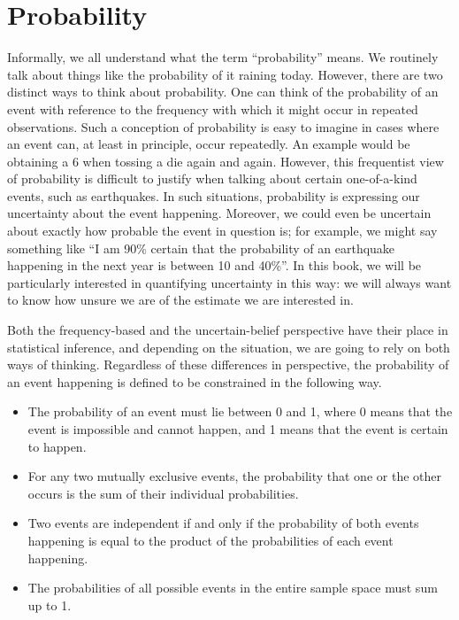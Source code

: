 \documentclass[12pt,]{krantz}
\providecommand{\tightlist}{%
  \setlength{\itemsep}{0pt}\setlength{\parskip}{0pt}}
\theoremstyle{definition}
\theoremstyle{definition}
\theoremstyle{definition}
\theoremstyle{remark}
\begin{document}
\hypertarget{introprob}{%
\section{Probability}\label{introprob}}

Informally, we all understand what the term ``probability'' means. We routinely talk about things like the probability of it raining today. However, there are two distinct ways to think about probability. One can think of the probability of an event with reference to the frequency with which it might occur in repeated observations. Such a conception of probability is easy to imagine in cases where an event can, at least in principle, occur repeatedly. An example would be obtaining a 6 when tossing a die again and again. However, this frequentist view of probability is difficult to justify when talking about certain one-of-a-kind events, such as earthquakes. In such situations, probability is expressing our uncertainty about the event happening. Moreover, we could even be uncertain about exactly how probable the event in question is; for example, we might say something like ``I am 90\% certain that the probability of an earthquake happening in the next year is between 10 and 40\%''. In this book, we will be particularly interested in quantifying uncertainty in this way: we will always want to know how unsure we are of the estimate we are interested in.

Both the frequency-based and the uncertain-belief perspective have their place in statistical inference, and depending on the situation, we are going to rely on both ways of thinking. Regardless of these differences in perspective, the probability of an event happening is defined to be constrained in the following way.

\begin{itemize}
\tightlist
\item
  The probability of an event must lie between 0 and 1, where 0 means that the event is impossible and cannot happen, and 1 means that the event is certain to happen.
\item
  For any two mutually exclusive events, the probability that one or the other occurs is the sum of their individual probabilities.
\item
  Two events are independent if and only if the probability of both events happening is equal to the product of the probabilities of each event happening.
\item
  The probabilities of all possible events in the entire sample space must sum up to 1.
\end{itemize}
\end{document}
